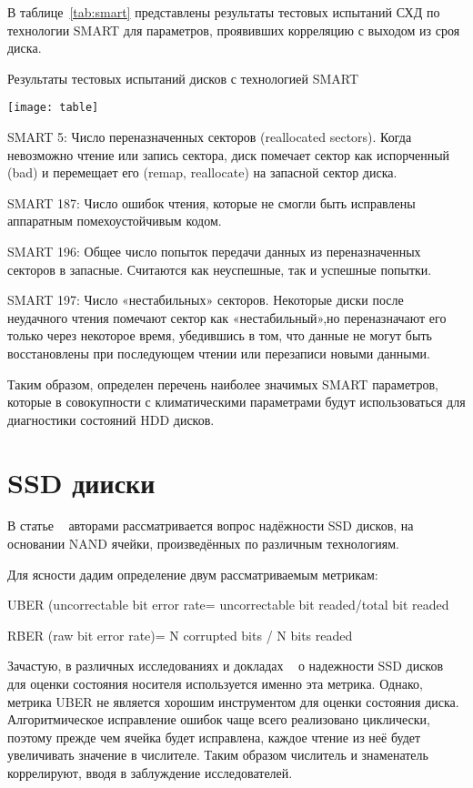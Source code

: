 В таблице~\ref{tab:smart} представлены результаты тестовых испытаний СХД по технологии SMART для параметров, проявивших корреляцию с выходом из сроя диска.
\begin{table}
	\captionsetup{skip=5pt}
	\caption{Результаты тестовых испытаний дисков с технологией SMART}
	\centering
	\texttt{[image: table]}
	\label{tab:smart}
\end{table}
\begin{itemize*}
	\item{SMART 5:  Число  переназначенных  секторов  (reallocated sectors).  Когда 
невозможно чтение или запись сектора, диск помечает сектор как испорченный (bad) и перемещает его (remap, reallocate) на запасной сектор диска.}
	\item{SMART 187:  Число  ошибок  чтения,  которые  не  смогли  быть  исправлены 
аппаратным помехоустойчивым кодом.}
	\item{SMART 196:  Общее  число  попыток  передачи  данных  из  переназначенных 
секторов в запасные. Считаются как неуспешные, так и успешные попытки.}
	\item{SMART 197:  Число «нестабильных» секторов.  Некоторые  диски  после 
неудачного  чтения  помечают  сектор  как «нестабильный»,но  переназначают  его 
только  через  некоторое  время,  убедившись  в  том,  что  данные  не  могут  быть 
восстановлены при последующем чтении или перезаписи новыми данными.} 
\end{itemize*}

Таким образом, определен перечень наиболее значимых SMART параметров, которые в совокупности с климатическими параметрами будут использоваться для  диагностики состояний HDD дисков. 
\section{SSD дииски}

В статье ~\cite{reliabil} авторами рассматривается вопрос надёжности SSD дисков, на основании NAND ячейки, произведённых по различным технологиям.

Для ясности дадим определение двум рассматриваемым метрикам:
\begin{itemize*}
	\item{UBER (uncorrectable bit error rate= uncorrectable bit readed/total bit readed}
	\item{RBER (raw bit error rate)= N corrupted bits / N bits readed}
\end{itemize*}
Зачастую, в различных исследованиях и докладах ~\cite{art} о надежности SSD дисков для оценки состояния носителя используется именно эта метрика. 
Однако, метрика UBER не является хорошим инструментом для оценки состояния диска. Алгоритмическое исправление ошибок чаще всего реализовано циклически, поэтому прежде чем ячейка будет исправлена, каждое чтение из неё будет увеличивать значение в числителе. Таким образом числитель и знаменатель коррелируют, вводя в заблуждение исследователей. 

